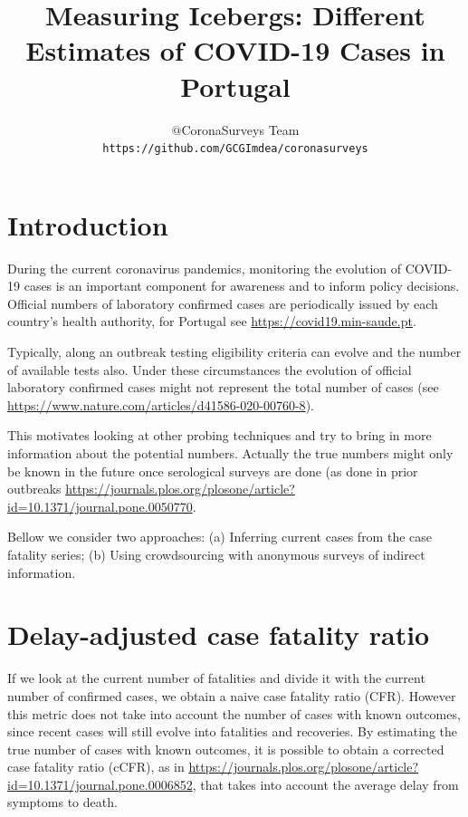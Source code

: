 \documentclass{article}
\begin{document}
\title{Measuring Icebergs: Different Estimates of COVID-19 Cases in Portugal}
\author{$@$CoronaSurveys Team \\ \texttt{https://github.com/GCGImdea/coronasurveys}}
\maketitle
\section{Introduction}

During the current coronavirus pandemics, monitoring the evolution of COVID-19 cases is an important component for awareness and to inform policy decisions. 
Official numbers of laboratory confirmed cases are periodically issued by each country's health authority, for Portugal see \url{https://covid19.min-saude.pt}. 

Typically, along an outbreak testing eligibility criteria can evolve and the number of available tests also. Under these circumstances the evolution of official laboratory confirmed cases might not represent the total number of cases (see \url{https://www.nature.com/articles/d41586-020-00760-8}).  

This motivates looking at other probing techniques and try to bring in more information about the potential numbers. Actually the true numbers might only be known in the future once serological surveys are done (as done in prior outbreaks \url{https://journals.plos.org/plosone/article?id=10.1371/journal.pone.0050770}.

Bellow we consider two approaches: (a) Inferring current cases from the case fatality series; (b) Using crowdsourcing with anonymous surveys of indirect information.  

\section{Delay-adjusted case fatality ratio}

If we look at the current number of fatalities and divide it with the current number of confirmed cases, we obtain a naive case fatality ratio (CFR). However this metric does not take into account the number of cases with known outcomes, since recent cases will still evolve into fatalities and recoveries. By estimating the true number of cases with known outcomes, it is possible to obtain a corrected case fatality ratio (cCFR), as in \url{https://journals.plos.org/plosone/article?id=10.1371/journal.pone.0006852}, that takes into account the average delay from symptoms to death.  
\end{document}
